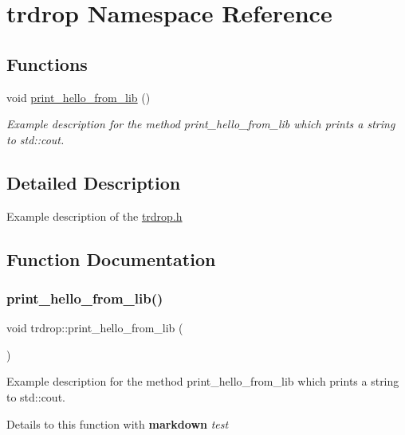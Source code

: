 \hypertarget{namespacetrdrop}{}\section{trdrop Namespace Reference}
\label{namespacetrdrop}
\subsection*{Functions}
\begin{DoxyCompactItemize}
\item 
void \hyperlink{namespacetrdrop_a35199d8889269d18e8d43ef115a785fe}{print\+\_\+hello\+\_\+from\+\_\+lib} ()
\begin{DoxyCompactList}\small\item\em Example description for the method {\ttfamily print\+\_\+hello\+\_\+from\+\_\+lib} which prints a string to std\+::cout. \end{DoxyCompactList}\end{DoxyCompactItemize}


\subsection{Detailed Description}
Example description of the \hyperlink{trdrop_8h}{trdrop.\+h} 

\subsection{Function Documentation}
\mbox{\label{namespacetrdrop_a35199d8889269d18e8d43ef115a785fe}} 
\subsubsection{\texorpdfstring{print\+\_\+hello\+\_\+from\+\_\+lib()}{print\_hello\_from\_lib()}}
{\footnotesize\ttfamily void trdrop\+::print\+\_\+hello\+\_\+from\+\_\+lib (\begin{DoxyParamCaption}{ }\end{DoxyParamCaption})}



Example description for the method {\ttfamily print\+\_\+hello\+\_\+from\+\_\+lib} which prints a string to std\+::cout. 

Details to this function with {\bfseries markdown} {\itshape test} 